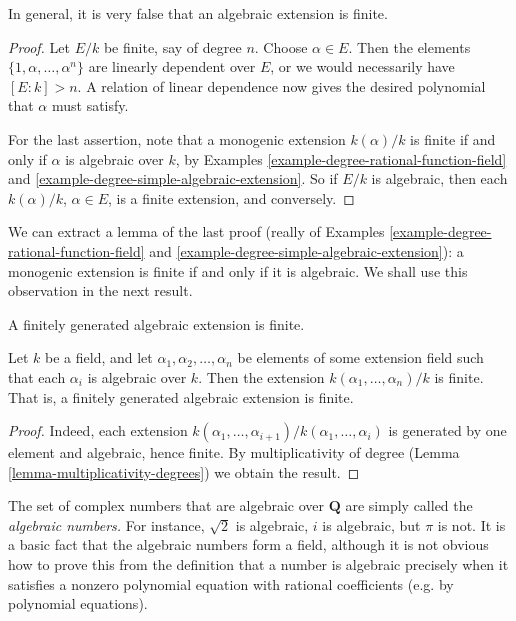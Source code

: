 \noindent
In general, it is very false that an algebraic extension is finite.

\begin{proof}
Let $E/k$ be finite, say of degree $n$. Choose $\alpha \in E$. Then the
elements $\{1, \alpha, \ldots, \alpha^n\}$ are linearly
dependent over $E$, or we would necessarily have $[E : k] > n$. A relation of
linear dependence now gives the desired polynomial that $\alpha$ must satisfy.

\medskip\noindent
For the last assertion, note that a monogenic extension $k(\alpha)/k$ is
finite if and only if $\alpha$ is algebraic over $k$, by
Examples \ref{example-degree-rational-function-field} and
\ref{example-degree-simple-algebraic-extension}.
So if $E/k$ is algebraic, then each $k(\alpha)/k$, $\alpha \in E$, is a finite
extension, and conversely.
\end{proof}

\noindent
We can extract a lemma of the last proof (really of
Examples \ref{example-degree-rational-function-field} and
\ref{example-degree-simple-algebraic-extension}):
a monogenic extension is finite if and only if it is algebraic.
We shall use this observation in the next result.

\begin{lemma}
\label{lemma-algebraic-finitely-generated}
\begin{slogan}
A finitely generated algebraic extension is finite.
\end{slogan}
Let $k$ be a field, and let $\alpha_1, \alpha_2, \ldots, \alpha_n$ be elements
of some extension field such that each $\alpha_i$ is algebraic over $k$. Then
the extension $k(\alpha_1, \ldots, \alpha_n)/k$ is finite.
That is, a finitely generated algebraic extension is finite.
\end{lemma}

\begin{proof}
Indeed, each extension
$k(\alpha_{1}, \ldots, \alpha_{i+1})/k(\alpha_1, \ldots, \alpha_{i})$
is generated by one element and algebraic, hence finite.
By multiplicativity of degree (Lemma \ref{lemma-multiplicativity-degrees})
we obtain the result.
\end{proof}

\noindent
The set of complex numbers that are algebraic over $\mathbf{Q}$ are simply
called the {\it algebraic numbers.} For instance, $\sqrt{2}$ is algebraic,
$i$ is algebraic, but $\pi$ is not.
It is a basic fact that the algebraic numbers form a field, although it is not
obvious how to prove this from the definition that a number is algebraic
precisely when it satisfies a nonzero polynomial equation with rational
coefficients (e.g. by polynomial equations).

